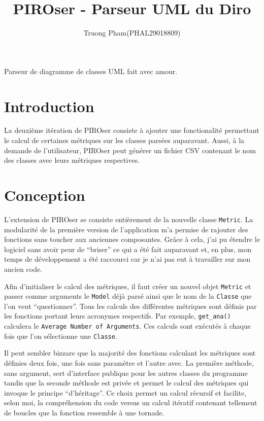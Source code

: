 \documentclass[12pt]{article}
\title{PIROser - Parseur UML du Diro}
\author{Truong Pham(PHAL29018809)}
\begin{document}
\maketitle

\abstract
Parseur de diagramme de classes UML fait avec amour.

\section{Introduction}

La deuxième itération de PIROser consiste à ajouter une fonctionalité permettant le calcul de certaines métriques sur les classes parsées auparavant. Aussi, à la demande de l'utilisateur, PIROser peut générer un fichier CSV contenant le nom des classes avec leurs métriques respectives.

\section{Conception}

L'extension de PIROser se consiste entièrement de la nouvelle classe \texttt{Metric}. La modularité de la première version de l'application m'a permise de rajouter des fonctions sans toucher aux anciennes composantes. Grâce à cela, j'ai pu étendre le logiciel sans avoir peur de ``briser'' ce qui a été fait auparavant et, en plus, mon temps de développement a été raccourci car je n'ai pas eut à travailler sur mon ancien code.

Afin d'initialiser le calcul des métriques, il faut créer un nouvel objet \texttt{Metric} et passer comme arguments le \texttt{Model} déjà parsé ainsi que le nom de la \texttt{Classe} que l'on veut ``questionner''. Tous les calculs des différentes métriques sont définis par les fonctions portant leurs acronymes respectifs. Par exemple, \texttt{get\_ana()} calculera le \texttt{Average Number of Arguments}. Ces calculs sont exécutés à chaque fois que l'on sélectionne une \texttt{Classe}.

Il peut sembler bizzare que la majorité des fonctions calculant les métriques sont définies deux fois, une fois sans paramètre et l'autre avec. La première méthode, sans argument, sert d'interface publique pour les autres classes du programme tandis que la seconde méthode est privée et permet le calcul des métriques qui invoque le principe ``d'héritage''. Ce choix permet un calcul récursif et facilite, selon moi, la compréhension du code versus un calcul itératif contenant tellement de boucles que la fonction ressemble à une tornade. 
\end{document}

